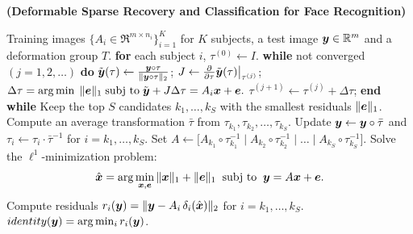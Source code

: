 \documentclass[12pt,journal,draftcls,letterpaper,onecolumn]{IEEEtran}
\newcommand{\subj}{\textup{subj to}}
\begin{document}
\begin{algorithm}[thb]
\caption{\bf (Deformable Sparse Recovery and Classification for
Face Recognition)} \label{alg:deformable-src}
\begin{algorithmic}[1]
\begin{small}
 Training images $\{A_i \in \Re^{m\times n_i}\}_{i=1}^K$ for $K$ subjects,  a test image
${\boldsymbol{y}}\in\mathbb R^m$ and a deformation group $T$. 
\STATE
{\bf for} each subject $i$, 
\STATE \hspace{3mm} $\tau^{(0)}
\leftarrow I$. 
\STATE \hspace{3mm} {\bf while} not converged $(j=1,2,\ldots)$ {\bf do} 
\STATE \hspace{6mm}
$\tilde {{\boldsymbol{y}}}(\tau) \leftarrow \frac{{\boldsymbol{y}} \circ \tau}{\|{\boldsymbol{y}} \circ
\tau\|_2}$; \;\;\; $J \leftarrow  \frac{\partial}{\partial
\tau} \tilde{{\boldsymbol{y}}}(\tau)  \bigr|_{\tau^{(j)}} $;
\STATE \hspace{6mm} $ \Delta \tau =  \arg\min \; \| \e \|_1  \;
\subj \; \tilde \y + J \Delta \tau = A_i \x + \e.$ 
\STATE
\hspace{6mm} $\tau^{(j+1)} \leftarrow \tau^{(j)} + \Delta
\tau$; 
\STATE \hspace{3mm} {\bf end while}  \STATE Keep
the top $S$ candidates $k_1, \ldots, k_S$ with the smallest
residuals $\|\boldsymbol{e}\|_1$. \STATE Compute an average transformation
$\bar{\tau}$ from $\tau_{k_1}, \tau_{k_2}, \ldots, \tau_{k_S}$.
\STATE Update ${\boldsymbol{y}} \leftarrow {\boldsymbol{y}} \circ \bar{\tau}$ and $\tau_i
\leftarrow \tau_i \cdot \bar{\tau}^{-1}$ for $i = k_1, \dots,
k_S$. \STATE Set $A \leftarrow \big[ A_{k_1} \circ
\tau_{k_1}^{-1} \mid A_{k_2} \circ \tau_{k_2}^{-1} \mid \dots
\mid A_{k_S} \circ \tau_{k_S}^{-1} \big]$. \STATE Solve the
$\ell^1$-minimization problem:
$$\hat{\x} = \arg \min_{\x, \e} \| \x \|_1 + \|\e\|_1 \;\; \subj \;\; \y = A \x + \e.$$
\STATE Compute residuals $r_i({\boldsymbol{y}}) = \| {{\boldsymbol{y}}} - {A}_i \, \delta_i(\hat{{\boldsymbol{x}}}) \|_2$ for $i = k_1, \dots, k_S$.
 $\relax{identity}({\boldsymbol{y}}) = \arg\min_i r_i({\boldsymbol{y}})$.
\end{small}
\end{algorithmic}
\end{algorithm}
\end{document}
